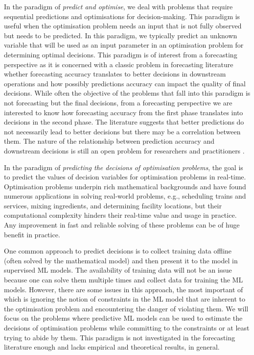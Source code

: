 \documentclass[graybox]{svmult}
\begin{document}
In the paradigm of \textit{predict and optimise}, we deal with problems that require sequential predictions and optimisations for decision-making. This paradigm is useful when the optimisation problem needs an input that is not fully observed but needs to be predicted. In this paradigm, we typically predict an unknown variable that will be used as an input parameter in an optimisation problem for determining optimal decisions. This paradigm is of interest from a forecasting perspective as it is concerned with a classic problem in forecasting literature whether forecasting accuracy translates to better decisions in downstream operations and how possibly predictions accuracy can impact the quality of final decisions. While often the objective of the problems that fall into this paradigm is not forecasting but the final decisions, from a forecasting perspective we are interested to know how forecasting accuracy from the first phase translates into decisions in the second phase. The literature suggests that better predictions do not necessarily lead to better decisions but there may be a correlation between them. The nature of the relationship between prediction accuracy and downstream decisions is still an open problem for researchers and practitioners \cite{abolghasemi2021effectively}. 

In the paradigm of \textit{predicting the decisions of optimisation problems}, the goal is to predict the values of decision variables for optimisation problems in real-time. Optimisation problems underpin rich mathematical backgrounds and have found numerous applications in solving real-world problems, e.g., scheduling trains and services, mixing ingredients, and determining facility locations, but their computational complexity hinders their real-time value and usage in practice. Any improvement in fast and reliable solving of these problems can be of huge benefit in practice.

One common approach to predict decisions is to collect training data offline (often solved by the mathematical model) and then present it to the model in supervised ML models. The availability of training data will not be an issue because one can solve them multiple times and collect data for training the ML models. However, there are some issues in this approach, the most important of which is ignoring the notion of constraints in the ML model that are inherent to the optimisation problem and encountering the danger of violating them. We will focus on the problems where predictive ML models can be used to estimate the decisions of optimisation problems while committing to the constraints or at least trying to abide by them. This paradigm is not investigated in the forecasting literature enough and lacks empirical and theoretical results, in general. 
\end{document}
